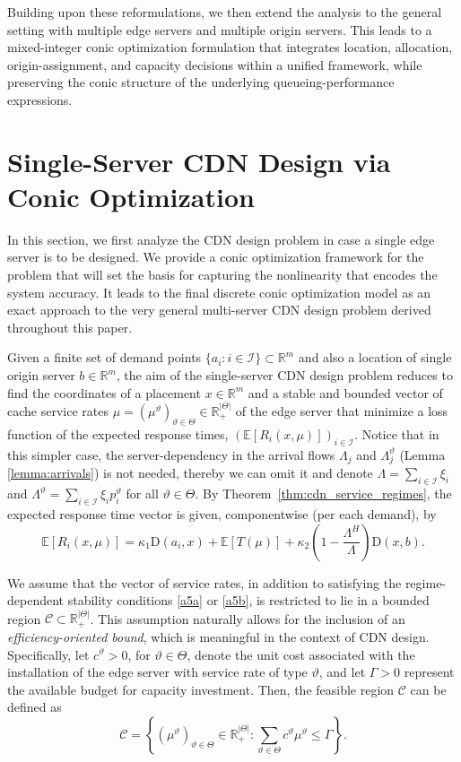 \documentclass[a4paper,11pt,reqno]{amsart}
\newcommand{\R}{\mathbb{R}}
\newcommand{\E}{\mathbb{E}}
\newcommand{\I}{\mathcal{I}}
\newcommand{\D}{\mathrm{D}}
\begin{document}
Building upon these reformulations, we then extend the analysis to the general setting with multiple edge servers and multiple origin servers. This leads to a mixed-integer conic optimization formulation that integrates location, allocation, origin-assignment, and capacity decisions within a unified framework, while preserving the conic structure of the underlying queueing-performance expressions.


\section{Single-Server CDN Design via Conic Optimization}\label{sec:singleServer}

In this section, we first analyze the CDN design problem in case a single edge server is to be designed. We provide a conic optimization framework for the problem that will set the basis for capturing the nonlinearity that encodes the system accuracy. It leads to the final discrete conic optimization model as an exact approach to the very general multi-server CDN design problem derived throughout this paper. 

Given a finite set of demand points $\{a_i:i\in\I\}\subset \R^m$ and also a location of single origin server $b\in\R^m$, the aim of the single-server CDN design problem reduces to find the coordinates of a placement $x\in\R^m$ and a stable and bounded vector of cache service rates $\mu=\left(\mu^\vartheta\right)_{\vartheta\in \Theta}\in\R_+^{|\Theta|}$ of the edge server that minimize a loss function of the expected response times, $(\E[R_i(x,\mu)])_{i\in\I}$. Notice that in this simpler case, the server-dependency in the arrival flows $\Lambda_j$ and $\Lambda_j^\vartheta$ (Lemma \ref{lemma:arrivals}) is not needed, thereby we can omit it and denote $\Lambda=\sum_{i\in\I}\xi_i$ and $\Lambda^\vartheta=\sum_{i\in\I}\xi_ip^\vartheta_i$ for all $\vartheta\in\Theta$. By Theorem~\ref{thm:cdn_service_regimes}, the expected response time vector is given, componentwise (per each demand), by
\begin{equation}
    \E[R_i(x,\mu)] = \kappa_1 \D(a_i,x)+ \E[T(\mu)] + \kappa_2\left(1-\frac{\Lambda^H}{\Lambda}\right) \D(x,b).
\end{equation}

We assume that the vector of service rates, in addition to satisfying the regime-dependent stability conditions \ref{a5a} or \ref{a5b}, is restricted to lie in a bounded region $\mathcal{C} \subset \R^{|\Theta|}_+$. This assumption naturally allows for the inclusion of an \emph{efficiency-oriented bound}, which is meaningful in the context of CDN design. Specifically, let $c^\vartheta >0$, for $\vartheta \in \Theta$, denote the unit cost associated with the installation of the edge server with service rate of type $\vartheta$, and let $\Gamma>0$ represent the available budget for capacity investment. Then, the feasible region $\mathcal{C}$ can be defined as
\begin{equation}
\mathcal{C} = \left\{ (\mu^\vartheta)_{\vartheta\in \Theta} \in \R^{|\Theta|}_+ : \sum_{\vartheta \in \Theta} c^\vartheta \mu^\vartheta \le \Gamma \right\}.
\label{budget}\tag{Budget}
\end{equation}
\end{document}
